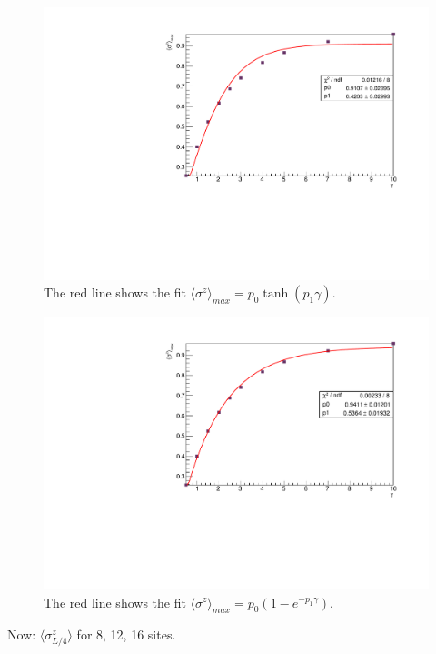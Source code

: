 \begin{figure}[H]
    \centering
    \includegraphics[scale=0.7]{Figures/FIT_8sites_PeakLMvsGamma_J1051.pdf}
    \caption{The red line shows the fit $\langle\sigma^z\rangle_{max} = p_0\tanh{(p_1\gamma)}$.}
    \label{fig:FIT_PeakLMvsGamma_J1051}
\end{figure}

\begin{figure}[H]
    \centering
    \includegraphics[scale=0.7]{Figures/FITexp_8sites_PeakLMvsGamma_J1051.pdf}
    \caption{The red line shows the fit $\langle\sigma^z\rangle_{max} = p_0(1-e^{-p_1\gamma})$.}
    \label{fig:FIT_PeakLMvsGamma_J1051}
\end{figure}

Now: $\langle\sigma^z_{L/4}\rangle$ for 8, 12, 16 sites.

